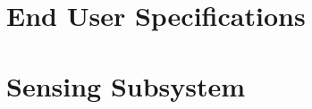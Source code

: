 \documentclass[12pt]{article}
\begin{document}

\tableofcontents
\pagebreak


\section{End User Specifications}

\newpage
\section{Sensing Subsystem} 

\end{document}
